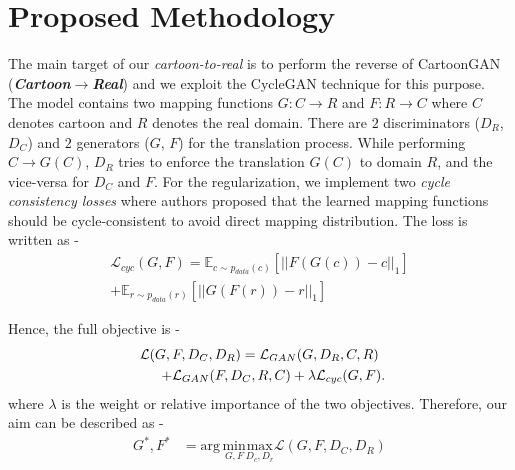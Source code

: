 \documentclass[conference,compsoc]{IEEEtran}
\begin{document}
\section{Proposed Methodology}
The main target of our \textit{cartoon-to-real} is to perform the reverse of CartoonGAN (\textbf{\textit{Cartoon$\rightarrow$Real}}) and we exploit the CycleGAN\cite{zhu2017unpaired} technique for this purpose. The model contains two mapping functions $G:C \rightarrow R$ and $F:R \rightarrow C$ where $C$ denotes cartoon and $R$ denotes the real domain. There are $2$ discriminators ($D_R$, $D_C$) and $2$ generators ($G$, $F$) for the translation process. While performing $C \rightarrow G(C)$, $D_R$ tries to enforce the translation $G(C)$ to domain $R$, and the vice-versa for $D_C$ and $F$. For the regularization, we implement two \textit{cycle consistency losses}\cite{zhu2017unpaired} where authors proposed that the learned mapping functions should be cycle-consistent to avoid direct mapping distribution. The loss is written as -
\begin{multline}
\mathcal{L}_{cyc}(G,F)=\mathds{E}_{c\sim p_{data}(c)}[||F(G(c)) - c||_1] \\
+ \mathds{E}_{r\sim p_{data}(r)}[||G(F(r)) - r||_1]
\end{multline}

Hence, the full objective is -
\begin{multline}
\mathcal{L}(G,F,D_C,D_R)=\mathcal{L}_{GAN}(G,D_R,C,R)\\
\qquad +\mathcal{L}_{GAN}(F,D_C,R,C)\linebreak
+\lambda \mathcal{L}_{cyc}(G, F).
\end{multline}
where $\lambda$ is the weight or relative importance of the two objectives. Therefore, our aim can be described as -
\begin{align}
G^{*},F^{*}&=\text{arg}\,\underset{G,F}{\text{min}}\underset{D_c,D_r}{\text{max}}\mathcal{L}(G,F,D_C,D_R)
\end{align}
\makeatletter
\setlength\@fptop{0pt} 
\setlength{} 
\setlength\@fpbot{0pt}
\makeatother
\end{document}
